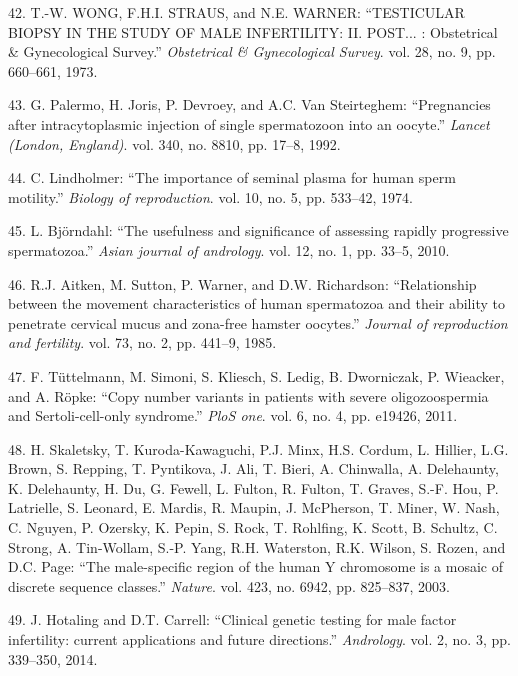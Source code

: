 \documentclass[12pt,twoside]{reedthesis}
\theoremstyle{definition}
\theoremstyle{definition}
\theoremstyle{remark}
\begin{document}
  \hypertarget{ref-WONG1973}{}
  42. T.-W. WONG, F.H.I. STRAUS, and N.E. WARNER: ``TESTICULAR BIOPSY IN
  THE STUDY OF MALE INFERTILITY: II. POST... : Obstetrical \&
  Gynecological Survey.'' \emph{Obstetrical \& Gynecological Survey}. vol.
  28, no. 9, pp. 660--661, 1973.
  
  \hypertarget{ref-Palermo1992}{}
  43. G. Palermo, H. Joris, P. Devroey, and A.C. Van Steirteghem:
  ``Pregnancies after intracytoplasmic injection of single spermatozoon
  into an oocyte.'' \emph{Lancet (London, England)}. vol. 340, no. 8810,
  pp. 17--8, 1992.
  
  \hypertarget{ref-Lindholmer1974}{}
  44. C. Lindholmer: ``The importance of seminal plasma for human sperm
  motility.'' \emph{Biology of reproduction}. vol. 10, no. 5, pp. 533--42,
  1974.
  
  \hypertarget{ref-Bjorndahl2010}{}
  45. L. Björndahl: ``The usefulness and significance of assessing rapidly
  progressive spermatozoa.'' \emph{Asian journal of andrology}. vol. 12,
  no. 1, pp. 33--5, 2010.
  
  \hypertarget{ref-Aitken1985}{}
  46. R.J. Aitken, M. Sutton, P. Warner, and D.W. Richardson:
  ``Relationship between the movement characteristics of human spermatozoa
  and their ability to penetrate cervical mucus and zona-free hamster
  oocytes.'' \emph{Journal of reproduction and fertility}. vol. 73, no. 2,
  pp. 441--9, 1985.
  
  \hypertarget{ref-Tuttelmann2011}{}
  47. F. Tüttelmann, M. Simoni, S. Kliesch, S. Ledig, B. Dworniczak, P.
  Wieacker, and A. Röpke: ``Copy number variants in patients with severe
  oligozoospermia and Sertoli-cell-only syndrome.'' \emph{PloS one}. vol.
  6, no. 4, pp. e19426, 2011.
  
  \hypertarget{ref-Skaletsky2003}{}
  48. H. Skaletsky, T. Kuroda-Kawaguchi, P.J. Minx, H.S. Cordum, L.
  Hillier, L.G. Brown, S. Repping, T. Pyntikova, J. Ali, T. Bieri, A.
  Chinwalla, A. Delehaunty, K. Delehaunty, H. Du, G. Fewell, L. Fulton, R.
  Fulton, T. Graves, S.-F. Hou, P. Latrielle, S. Leonard, E. Mardis, R.
  Maupin, J. McPherson, T. Miner, W. Nash, C. Nguyen, P. Ozersky, K.
  Pepin, S. Rock, T. Rohlfing, K. Scott, B. Schultz, C. Strong, A.
  Tin-Wollam, S.-P. Yang, R.H. Waterston, R.K. Wilson, S. Rozen, and D.C.
  Page: ``The male-specific region of the human Y chromosome is a mosaic
  of discrete sequence classes.'' \emph{Nature}. vol. 423, no. 6942, pp.
  825--837, 2003.
  
  \hypertarget{ref-Hotaling2014}{}
  49. J. Hotaling and D.T. Carrell: ``Clinical genetic testing for male
  factor infertility: current applications and future directions.''
  \emph{Andrology}. vol. 2, no. 3, pp. 339--350, 2014.
  
\end{document}
